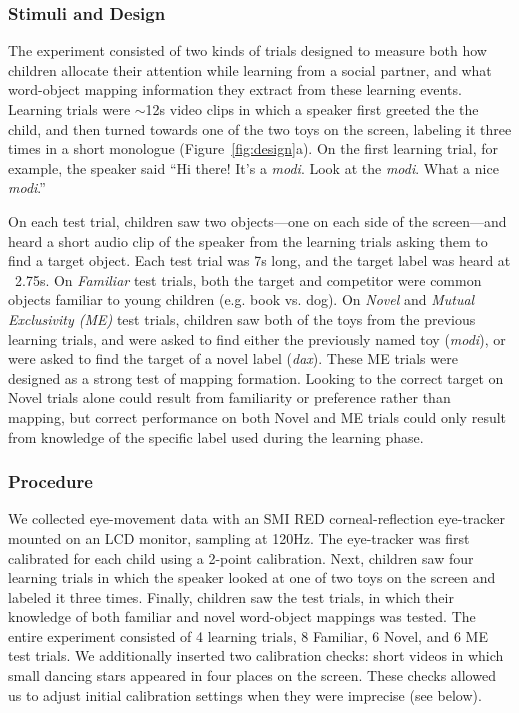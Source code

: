 \documentclass[man,floatsintext]{apa6}
\begin{document}
\subsubsection{Stimuli and Design}

The experiment consisted of two kinds of trials designed to measure both how children allocate their attention while learning from a social partner, and what word-object mapping information they extract from these learning events. Learning trials were $\sim$12s video clips in which a speaker first greeted the the child, and then turned towards one of the two toys on the screen, labeling it three times in a short monologue (Figure~\ref{fig:design}a). On the first learning trial, for example, the speaker said ``Hi there! It's a \emph{modi}. Look at the \emph{modi}. What a nice \emph{modi}.''

On each test trial, children saw two objects---one on each side of the screen---and heard a short audio clip of the speaker from the learning trials asking them to find a target object. Each test trial was 7s long, and the target label was heard at ~2.75s. On \emph{Familiar} test trials, both the target and competitor were common objects familiar to young children (e.g. book vs. dog). On \emph{Novel} and  \emph{Mutual Exclusivity (ME)} test trials, children saw both of the toys from the previous learning trials, and were asked to find either the previously named toy (\emph{modi}), or were asked to find the target of a novel label (\emph{dax}). These ME trials were designed as a strong test of mapping formation. Looking to the correct target on Novel trials alone could result from familiarity or preference rather than mapping, but correct performance on both Novel and ME trials could only result from knowledge of the specific label used during the learning phase.


\subsubsection{Procedure}

We collected eye-movement data with an SMI RED corneal-reflection eye-tracker mounted on an LCD monitor, sampling at 120Hz. The eye-tracker was first calibrated for each child using a 2-point calibration. Next, children saw four learning trials in which the speaker looked at one of two toys on the screen and labeled it three times. Finally, children saw the test trials, in which their knowledge of both familiar and novel word-object mappings was tested. The entire experiment consisted of 4 learning trials, 8 Familiar, 6 Novel, and 6 ME test trials. We additionally inserted two calibration checks: short videos in which small dancing stars appeared in four places on the screen.  These checks allowed us to adjust initial calibration settings when they were imprecise (see below).
\end{document}
